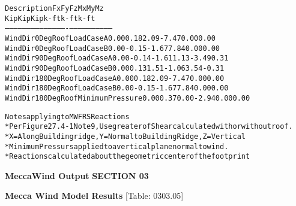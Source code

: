\documentclass[12pt,notitle,letterpaper]{report}
\renewenvironment{quote}
  {\small\list{}{\rightmargin=0cm \leftmargin=0cm}%
   \item\relax}
  {\endlist}
\begin{document}
\begin{quote}
\begin{alltt}
                 Description                Fx   Fy    Fz    Mx    My    Mz
                                           Kip   Kip   Kip  k-ft  k-ft  k-ft
    -------------------------------------- ---- ----- ----- ----- ----- -----
    Wind Dir 0 Deg Roof Load Case A        0.00  0.18  2.09 -7.47  0.00  0.00
    Wind Dir 0 Deg Roof Load Case B        0.00 -0.15 -1.67  7.84  0.00  0.00
    Wind Dir 90 Deg Roof Load Case A       0.00 -0.14 -1.61  1.13 -3.49  0.31
    Wind Dir 90 Deg Roof Load Case B       0.00  0.13  1.51 -1.06  3.54 -0.31
    Wind Dir 180 Deg Roof Load Case A      0.00  0.18  2.09 -7.47  0.00  0.00
    Wind Dir 180 Deg Roof Load Case B      0.00 -0.15 -1.67  7.84  0.00  0.00
    Wind Dir 180 Deg Roof Minimum Pressure 0.00  0.37  0.00 -2.94  0.00  0.00



       Notes applying to MWFRS Reactions
       * Per Figure 27.4-1 Note 9, Use greater of Shear calculated with or without roof.
       * X= Along Building ridge, Y = Normal to Building Ridge, Z = Vertical
       * Minimum Pressurs applied to a vertical plane normal to wind.
       * Reactions calculated about the geometric center of the footprint
\end{alltt}
\end{quote}

\vspace{.2in}   \textbf{MeccaWind Output}   \hfill\textbf{SECTION 03}
\newline   \vspace{.05in}   {\color{black}\hrulefill}

\textbf{Mecca Wind Model Results} \hfill  {[}Table: 0303.05{]}
\end{document}
